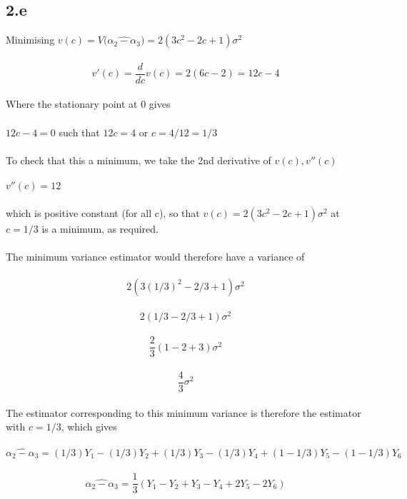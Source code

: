 \documentclass[11pt]{article}   	%
\begin{document}
\subsection*{2.e}

Minimising $ v(c) = V \big( \widehat{ \alpha_2 - \alpha_3 } \big) = 2(3c^2 - 2c + 1) \sigma^2 $ \\
\\
\[ v'(c) = \frac{d}{dc} v(c) = 2(6c - 2) = 12c - 4 \]
\\
Where the stationary point at 0 gives \\
\\
$ 12c - 4 = 0 $ such that $ 12c = 4 $ or $ c = 4/12 = 1/3 $ \\
\\
To check that this a minimum, we take the 2nd derivative of $ v(c), v''(c) $ \\
\\
$ v''(c) = 12 $ \\
\\
which is positive constant (for all c), so that $ v(c) = 2(3c^2 - 2c + 1) \sigma^2 $ at $ c = 1/3 $ is a minimum, as required. \\
\\
The minimum variance estimator would therefore have a variance of \\
\ 
\[ 2(3 (1/3)^2 - 2/3 + 1) \sigma^2 \]
\
\[ 2(1/3 - 2/3 + 1) \sigma^2 \]
\
\[ \frac{2}{3} (1 - 2 + 3) \sigma^2 \]
\
\[ \frac{4}{3} \sigma^2 \]
\\
The estimator corresponding to this minimum variance is therefore the estimator with $ c = 1/3 $, which gives \\
\
\[ \widehat{ \alpha_2 - \alpha_3 } = (1/3)Y_1 - (1/3)Y_2 + (1/3)Y_3 - (1/3)Y_4 + (1 - 1/3)Y_5 - (1 - 1/3)Y_6 \]
\
\[ \widehat{ \alpha_2 - \alpha_3 } = \frac{1}{3} (Y_1 - Y_2 + Y_3 - Y_4 + 2 Y_5 - 2 Y_6) \]
\end{document}
